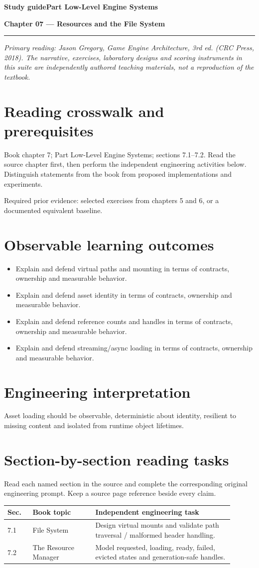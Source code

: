 \documentclass[11pt,letterpaper]{article}
\newcommand{\DocType}{Reference}
\newcommand{\SuiteHeading}[3]{%
\renewcommand{\DocType}{#2}%
{\small\bfseries\sffamily\color{EngineTeal}#2\hfill #3}\par\vspace{6pt}
{\LARGE\bfseries\color{EngineBlue}#1}\par\vspace{4pt}
{\color{EngineTeal}\rule{\linewidth}{1pt}}\par\vspace{7pt}}
\newcommand{\SourceNote}{\footnotesize\textit{Primary reading: Jason Gregory, \emph{Game Engine Architecture}, 3rd ed. (CRC Press, 2018). The narrative, exercises, laboratory designs and scoring instruments in this suite are independently authored teaching materials, not a reproduction of the textbook.}\normalsize\par}
\begin{document}
\SuiteHeading{Chapter 07 — Resources and the File System}{Study guide}{Part Low-Level Engine Systems}
\SourceNote
\section{Reading crosswalk and prerequisites}
Book chapter 7; Part Low-Level Engine Systems; sections 7.1--7.2. Read the source chapter first, then perform the independent engineering activities below. Distinguish statements from the book from proposed implementations and experiments.

Required prior evidence: selected exercises from chapters 5 and 6, or a documented equivalent baseline.

\section{Observable learning outcomes}
\begin{itemize}
\item Explain and defend virtual paths and mounting in terms of contracts, ownership and measurable behavior.
\item Explain and defend asset identity in terms of contracts, ownership and measurable behavior.
\item Explain and defend reference counts and handles in terms of contracts, ownership and measurable behavior.
\item Explain and defend streaming/async loading in terms of contracts, ownership and measurable behavior.
\end{itemize}
\section{Engineering interpretation}
Asset loading should be observable, deterministic about identity, resilient to missing content and isolated from runtime object lifetimes.

\section{Section-by-section reading tasks}
Read each named section in the source and complete the corresponding original engineering prompt. Keep a source page reference beside every claim.
\small\begin{longtable}{|p{0.10\linewidth}|p{0.25\linewidth}|p{0.55\linewidth}|}
\hline \textbf{Sec.} & \textbf{Book topic} & \textbf{Independent engineering task} \\ \hline\endhead
7.1 & File System & Design virtual mounts and validate path traversal / malformed header handling. \\ \hline
7.2 & The Resource Manager & Model requested, loading, ready, failed, evicted states and generation-safe handles. \\ \hline
\end{longtable}\normalsize
\end{document}
